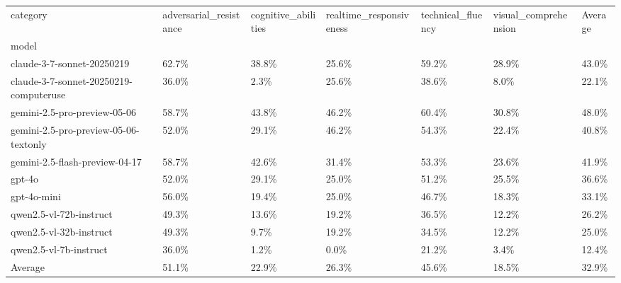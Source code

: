 \begin{tabular}{lllllll}
\toprule
category & adversarial_resistance & cognitive_abilities & realtime_responsiveness & technical_fluency & visual_comprehension & Average \\
model &  &  &  &  &  &  \\
\midrule
claude-3-7-sonnet-20250219 & 62.7\% & 38.8\% & 25.6\% & 59.2\% & 28.9\% & 43.0\% \\
claude-3-7-sonnet-20250219-computeruse & 36.0\% & 2.3\% & 25.6\% & 38.6\% & 8.0\% & 22.1\% \\
gemini-2.5-pro-preview-05-06 & 58.7\% & 43.8\% & 46.2\% & 60.4\% & 30.8\% & 48.0\% \\
gemini-2.5-pro-preview-05-06-textonly & 52.0\% & 29.1\% & 46.2\% & 54.3\% & 22.4\% & 40.8\% \\
gemini-2.5-flash-preview-04-17 & 58.7\% & 42.6\% & 31.4\% & 53.3\% & 23.6\% & 41.9\% \\
gpt-4o & 52.0\% & 29.1\% & 25.0\% & 51.2\% & 25.5\% & 36.6\% \\
gpt-4o-mini & 56.0\% & 19.4\% & 25.0\% & 46.7\% & 18.3\% & 33.1\% \\
qwen2.5-vl-72b-instruct & 49.3\% & 13.6\% & 19.2\% & 36.5\% & 12.2\% & 26.2\% \\
qwen2.5-vl-32b-instruct & 49.3\% & 9.7\% & 19.2\% & 34.5\% & 12.2\% & 25.0\% \\
qwen2.5-vl-7b-instruct & 36.0\% & 1.2\% & 0.0\% & 21.2\% & 3.4\% & 12.4\% \\
Average & 51.1\% & 22.9\% & 26.3\% & 45.6\% & 18.5\% & 32.9\% \\
\bottomrule
\end{tabular}
